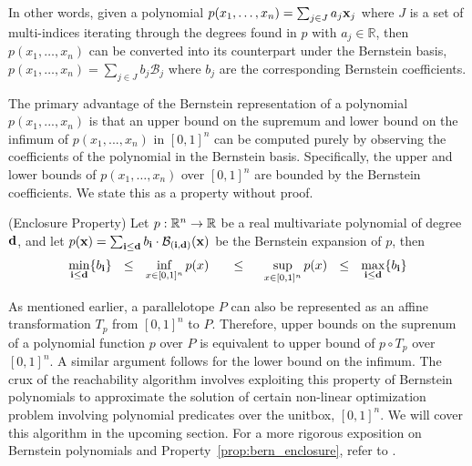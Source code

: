 \noindent In other words, given a polynomial $p(x_1,\ldots,x_n) = \sum_{j \in J} a_j {\bf x}_{j}$ where $J$ is a set of multi-indices iterating through the degrees found in $p$ with $a_j \in \mathbb{R}$, then $p(x_1,\ldots,x_n)$ can be converted into its counterpart under the Bernstein basis, $p(x_1,\ldots,x_n) = \sum_{j \in J} b_j \mathcal{B}_j $ where $b_j$ are the corresponding Bernstein coefficients.

The primary advantage of the Bernstein representation of a polynomial $p(x_1,...,x_n)$ is that an upper bound on the supremum and lower bound on the infimum of $p(x_1,...,x_n)$ in $[0,1]^{n}$ can be computed purely by observing the coefficients of the polynomial in the Bernstein basis. Specifically, the upper and lower bounds of $p(x_1,\ldots,x_n)$ over $[0,1]^n$ are bounded by the Bernstein coefficients. We state this as a property without proof.

\begin{property} (Enclosure Property)
  \label{prop:bern_enclosure}
  Let $p: {\mathbb{R}}^n \rightarrow {\mathbb{R}}$ be a real multivariate polynomial of degree ${\bf d}$, and let $p({\bf x}) = \sum_{{\bf i} \leq {\bf d}} b_{\bf i} \cdot \mathcal{B}_{({\bf i},{\bf d})}({\bf x})$ be the Bernstein expansion of $p$, then
  $$
  \min_{{\bf i} \leq {\bf d}} \{b_{\bf i}\} ~~\leq~~ \inf_{x \in [0,1]^n} p(x) ~~~~~\leq~~~~ \sup_{x \in [0,1]^{n}} p(x) ~~\leq~~ \max_{{\bf i} \leq {\bf d}} \{b_{\bf i}\}
  $$
\end{property}


As mentioned earlier, a parallelotope $P$ can also be represented as an affine transformation $T_{p}$ from $[0,1]^{n}$ to $P$.
%
Therefore, upper bounds on the suprenum of a polynomial function $p$ over $P$ is equivalent to upper bound of $p \circ T_{p}$ over $[0,1]^{n}$.
%
A similar argument follows for the lower bound on the infimum.
%
The crux of the reachability algorithm involves exploiting this property of Bernstein polynomials to approximate the solution of certain non-linear optimization problem involving polynomial predicates over the unitbox, $[0,1]^n$.
%
We will cover this algorithm in the upcoming section.
%
For a more rigorous exposition on Bernstein polynomials and Property~\ref{prop:bern_enclosure}, refer to \cite{garloff2003bernstein}.


